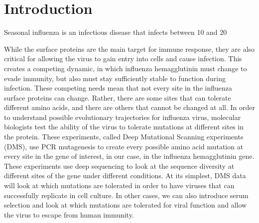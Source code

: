 \documentclass[sigchi]{acmart}
\begin{document}



\section{Introduction}

Seasonal influenza is an infectious disease that infects between 10 and 20%

While the surface proteins are the main target for immune response, they are also critical for allowing the virus to gain entry into cells and cause infection. This creates a competing dynamic, in which influenza hemagglutinin must change to evade immunity, but also must stay sufficiently stable to function during infection. These competing needs mean that not every site in the influenza surface proteins can change. Rather, there are some sites that can tolerate different amino acids, and there are others that cannot be changed at all. In order to understand possible evolutionary trajectories for influenza virus, molecular biologists test the ability of the virus to tolerate mutations at different sites in the protein. These experiments, called Deep Mutational Scanning experiments (DMS), use PCR mutagenesis to create every possible amino acid mutation at every site in the gene of interest, in our case, in the influenza hemagglutinin gene. These experiments use deep sequencing to look at the sequence diversity at different sites of the gene under different conditions. At its simplest, DMS data will look at which mutations are tolerated in order to have viruses that can successfully replicate in cell culture. In other cases, we can also introduce serum selection and look at which mutations are tolerated for viral function and allow the virus to escape from human immunity.
\end{document}
